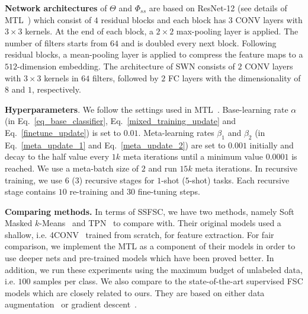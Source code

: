 \documentclass{article}
\newcommand{\myparagraph}[1]{\vspace{0.1em}\noindent\textbf{#1}}
\begin{document}
\myparagraph{Network architectures} of $\Theta$ and $\Phi_{ss}$ are based on ResNet-12 (see details of MTL~\cite{SunCVPR2019}) which 
consist of $4$ residual blocks and each block has $3$ CONV layers with $3 \times 3$ kernels. 
At the end of each block, a $2 \times 2$ max-pooling layer is applied. The number of filters starts from $64$ and is doubled every next block.
Following residual blocks, a mean-pooling layer is applied to compress the feature maps to a $512$-dimension embedding. 
The architecture of SWN consists of $2$ CONV layers with $3\times 3$ kernels in $64$ filters, followed by $2$ FC layers with the dimensionality of $8$ and $1$, respectively.  

\myparagraph{Hyperparameters}. 
We follow the settings used in MTL~\cite{SunCVPR2019}. 
Base-learning rate $\alpha$ (in Eq.~\ref{eq_base_classifier}, Eq.~\ref{mixed_training_update} and Eq.~\ref{finetune_update}) is set to $0.01$.
Meta-learning rates $\beta_{1}$ and $\beta_{2}$ (in Eq.~\ref{meta_update_1} and Eq.~\ref{meta_update_2}) are set to $0.001$ initially and decay to the half value every $1k$ meta iterations until a minimum value $0.0001$ is reached.
We use a meta-batch size of $2$ and run $15k$ meta iterations. 
In recursive training, we use $6$ ($3$) recursive stages for $1$-shot ($5$-shot) tasks.
Each recursive stage contains $10$ re-training and $30$ fine-tuning steps. 


\myparagraph{Comparing methods.}
In terms of SSFSC, we have two methods, namely Soft Masked $k$-Means~\cite{RenICLR2018_semisupervised} and TPN~\cite{LiuICLR2019transductive}
to compare with.
Their original models used a shallow, i.e. 4CONV~\cite{FinnAL17} trained from scratch, for feature extraction. 
For fair comparison, we implement the MTL as a component of their models in order to use deeper nets and pre-trained models which have been proved better.
In addition, we run these experiments using the maximum budget of unlabeled data, i.e. $100$ samples per class.
We also compare to the state-of-the-art supervised FSC models which are closely related to ours.
They are based on either data augmentation~\cite{Mehrotra2017, SchwartzNIPS18} or gradient descent~\cite{FinnAL17, RaviICLR2017, GrantICLR2018, FranceschiICML18, ZhangNIPS2018MetaGAN, MunkhdalaiICML18, RusuICLR2019, SunCVPR2019, LeeCVPR19svm}.
\end{document}

